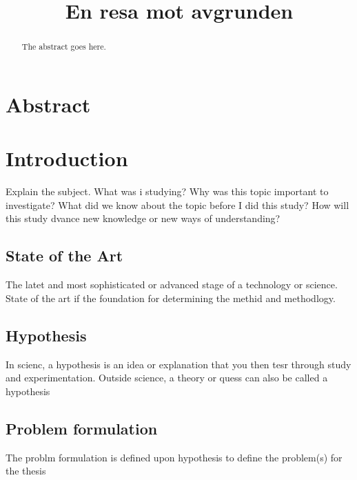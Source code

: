 \documentclass[conference]{IEEEtran}
\begin{document}
\title{En resa mot avgrunden}

\author{
\and
}

\maketitle

\begin{abstract}
The abstract goes here.
\end{abstract}

\IEEEpeerreviewmaketitle

\section{Abstract}

\section{Introduction}
Explain the subject. What was i studying? Why was this topic important to investigate? What did we know about the topic before I did this study? How will this study dvance new knowledge or new ways of understanding?
\subsection{State of the Art}
The latet and most sophisticated or advanced stage of a technology or science. State of the art if the foundation for determining the methid and methodlogy.
\subsection{Hypothesis}
In scienc, a hypothesis is an idea or explanation that you then tesr through study and experimentation. Outside science, a theory or quess can also be called a hypothesis
\subsection{Problem formulation}
The problm formulation is defined upon hypothesis to define the problem(s) for the thesis
\end{document}
